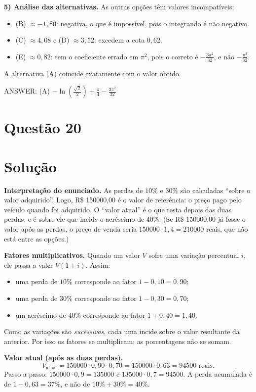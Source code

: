 \documentclass{article}%
\begin{document}
\textbf{5) Análise das alternativas.} As outras opções têm valores incompatíveis:
\begin{itemize}
\item (B) $\approx -1{,}80$: negativa, o que é impossível, pois o integrando é não negativo.
\item (C) $\approx 4{,}08$ e (D) $\approx 3{,}52$: excedem a cota $0{,}62$.
\item (E) $\approx 0{,}82$: tem o coeficiente errado em $\pi^2$, pois o correto é $-\frac{3\pi^2}{32}$, e não $-\frac{\pi^2}{32}$.
\end{itemize}
A alternativa (A) coincide exatamente com o valor obtido.

ANSWER: (A) $-\ln\left(\frac{\sqrt{2}}{2}\right)+\frac{\pi}{4}-\frac{3\pi^2}{32}$%
\newpage%
\section*{Questão 20}

\section*{Solução}

\textbf{Interpretação do enunciado.} As perdas de $10\%$ e $30\%$ são calculadas ``sobre o valor adquirido''. Logo, R\$ 150000,00 é o valor de referência: o preço pago pelo veículo quando foi adquirido. O ``valor atual'' é o que resta depois das duas perdas, e é sobre ele que incide o acréscimo de $40\%$. (Se R\$ 150000,00 já fosse o valor após as perdas, o preço de venda seria $150000\cdot 1{,}4 = 210000$ reais, que não está entre as opções.)

\textbf{Fatores multiplicativos.} Quando um valor $V$ sofre uma variação percentual $i$, ele passa a valer $V(1+i)$. Assim:
\begin{itemize}
  \item uma perda de $10\%$ corresponde ao fator $1-0{,}10 = 0{,}90$;
  \item uma perda de $30\%$ corresponde ao fator $1-0{,}30 = 0{,}70$;
  \item um acréscimo de $40\%$ corresponde ao fator $1+0{,}40 = 1{,}40$.
\end{itemize}
Como as variações são \emph{sucessivas}, cada uma incide sobre o valor resultante da anterior. Por isso os fatores se multiplicam; as porcentagens não se somam.

\textbf{Valor atual (após as duas perdas).}
\[
V_{\text{atual}} = 150000 \cdot 0{,}90 \cdot 0{,}70 = 150000 \cdot 0{,}63 = 94500 \text{ reais}.
\]
Passo a passo: $150000\cdot 0{,}9 = 135000$ e $135000\cdot 0{,}7 = 94500$. A perda acumulada é de $1-0{,}63 = 37\%$, e não de $10\% + 30\% = 40\%$.
\end{document}
